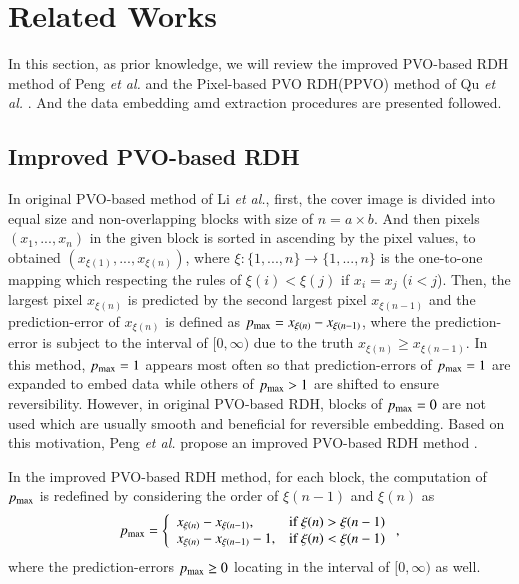 \documentclass[review,3p,10pt,sort&compress]{elsarticle}
\begin{document}
\section{Related Works}\label{sec:2}
In this section, as prior knowledge, we will review the improved PVO-based RDH method of Peng \emph{et al.} \cite{Peng2014IPVO} and the Pixel-based PVO RDH(PPVO) method of Qu \emph{et al.} \cite{Qu2015PPVO}. And the data embedding amd extraction procedures are presented followed.

\subsection{Improved PVO-based RDH \cite{Peng2014IPVO}}\label{sec:2.1}
In original PVO-based method \cite{Li2013PVO} of Li \emph{et al.}, first, the cover image is divided into equal size and non-overlapping blocks with size of $n = a \times b$. And then pixels $(x_{1},...,x_{n})$ in the given block is sorted in ascending by the pixel values, to obtained $(x_{\xi(1)},...,x_{\xi(n)})$, where $\xi : \{1,...,n\} \rightarrow \{1,...,n\}$ is the one-to-one mapping which respecting the rules of $\xi(i) < \xi(j)$ if $x_{i} = x_{j}$ ($i < j$). Then, the largest pixel $x_{\xi(n)}$ is predicted by the second largest pixel $x_{\xi(n-1)}$ and the prediction-error of $x_{\xi(n)}$ is defined as $p_{\rm max} = x_{\xi(n)} - x_{\xi(n-1)}$, where the prediction-error is subject to the interval of $[0, \infty)$ due to the truth $x_{\xi(n)} \geq x_{\xi(n-1)}$. In this method, $p_{\rm max} = 1$ appears  most often so that prediction-errors of $p_{\rm max} = 1$ are expanded to embed data while others of $p_{\rm max} > 1$
are shifted to ensure reversibility. However, in original PVO-based RDH, blocks of $p_{\rm max} = 0$ are not used which are usually smooth and beneficial for reversible embedding. Based on this motivation, Peng \emph{et al.} propose an improved PVO-based RDH method \cite{Peng2014IPVO}.

In the improved PVO-based RDH method, for each block, the computation of $p_{\rm max}$ is redefined by considering the order of $\xi(n-1)$ and $\xi(n)$ as
\begin{equation}\label{eq:pmax}
p_{\rm max} = \left\{\begin{array}{ll}
x_{\xi(n)} - x_{\xi(n-1)},      & \text{if } \xi(n) > \xi(n-1) \\
x_{\xi(n)} - x_{\xi(n-1)} - 1,  & \text{if } \xi(n) < \xi(n-1)
\end{array}\right.,
\end{equation}
where the prediction-errors $p_{\rm max} \geq 0$ locating in the interval of $[0, \infty)$ as well.
\end{document}
